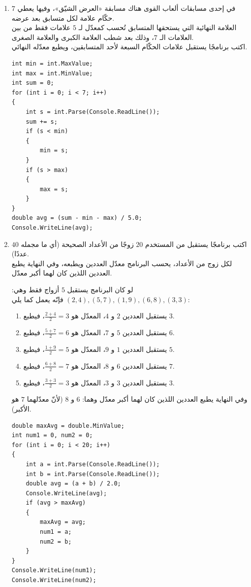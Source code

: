 \documentclass[14pt]{extarticle}
\begin{document}
\begin{enumerate}[resume, itemsep=2em]
\item في إحدى مسابقات ألعاب القوى هناك مسابقة «العرض الشيّق»، وفيها يعطي $7$ حكّام علامة لكل متسابق بعد عرضه. \\
العلامة النهائية التي يستحقها المتسابق تُحسب كمعدّل لـ $5$ علامات فقط من بين العلامات الـ $7$، وذلك بعد شطب العلامة الكبرى والعلامة الصغرى. \\
اكتب برنامجًا يستقبل علامات الحكّام السبعة لأحد المتسابقين، ويطبع معدّله النهائي.
\ifwithsols
\begin{boxSolution}
\begin{english}
\begin{verbatim}
int min = int.MaxValue;
int max = int.MinValue;
int sum = 0;
for (int i = 0; i < 7; i++)
{
    int s = int.Parse(Console.ReadLine());
    sum += s;
    if (s < min)
    {
        min = s;
    }
    if (s > max)
    {
        max = s;
    }
}
double avg = (sum - min - max) / 5.0;
Console.WriteLine(avg);
\end{verbatim}
\end{english}
\end{boxSolution}
\fi
\filbreak

\item اكتب برنامجًا يستقبل من المستخدم $20$ زوجًا من الأعداد الصحيحة (أي ما مجمله $40$ عددًا). \\
لكل زوج من الأعداد، يحسب البرنامج معدّل العددين ويطبعه، وفي النهاية يطبع العددين اللذين كان لهما أكبر معدّل.
\ifdetailed
\begin{boxExample}
لو كان البرنامج يستقبل $5$ أزواج فقط وهي: $(2,4), (5,7), (1,9), (6,8), (3,3)$ فإنّه يعمل كما يلي:
\begin{enumerate}[label=(\arabic*), nosep]
    \item يستقبل العددين $2$ و $4$، المعدّل هو $\frac{2+4}{2} = 3$، فيطبع $3$.
    \item يستقبل العددين $5$ و $7$، المعدّل هو $\frac{5+7}{2} = 6$، فيطبع $6$.
    \item يستقبل العددين $1$ و $9$، المعدّل هو $\frac{1+9}{2} = 5$، فيطبع $5$.
    \item يستقبل العددين $6$ و $8$، المعدّل هو $\frac{6+8}{2} = 7$، فيطبع $7$.
    \item يستقبل العددين $3$ و $3$، المعدّل هو $\frac{3+3}{2} = 3$، فيطبع $3$.
\end{enumerate}
وفي النهاية يطبع العددين اللذين كان لهما أكبر معدّل وهما: $6$ و $8$ (لأنّ معدّلهما $7$ هو الأكبر).
\end{boxExample}
\fi
\ifwithsols
\begin{boxSolution}
\begin{english}
\begin{verbatim}
double maxAvg = double.MinValue;
int num1 = 0, num2 = 0;
for (int i = 0; i < 20; i++)
{
    int a = int.Parse(Console.ReadLine());
    int b = int.Parse(Console.ReadLine());
    double avg = (a + b) / 2.0;
    Console.WriteLine(avg);
    if (avg > maxAvg)
    {
        maxAvg = avg;
        num1 = a;
        num2 = b;
    }
}
Console.WriteLine(num1);
Console.WriteLine(num2);
\end{verbatim}
\end{english}
\end{boxSolution}
\fi
\filbreak


\end{enumerate}
\end{document}
